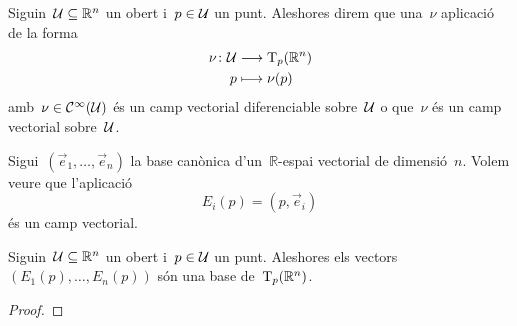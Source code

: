 \documentclass[../geometria-diferencial.tex]{subfiles}
\begin{document}
    \begin{definition}
        \label{def:camp-vectorial-diferenciable}
        Siguin~\(\mathcal{U}\subseteq\mathbb{R}^{n}\) un obert i~\(p\in\mathcal{U}\) un punt.
        Aleshores direm que una~\(\nu\) aplicació de la forma
        \begin{align*}
            \nu\colon\mathcal{U}&\longrightarrow\operatorname{T}_{p}(\mathbb{R}^{n}) \\
            p&\longmapsto\nu(p)
        \end{align*}
        amb~\(\nu\in\mathcal{C}^{\infty}(\mathcal{U})\) és un camp vectorial diferenciable sobre~\(\mathcal{U}\) o que~\(\nu\) és un camp vectorial sobre~\(\mathcal{U}\).
    \end{definition}
    \begin{example}%
        \label{ex:camp-vectorial-canonic}
        Sigui~\((\vec{e}_{1},\dots,\vec{e}_{n})\) la base canònica d'un~\(\mathbb{R}\)-espai vectorial de dimensió~\(n\).
        Volem veure que l'aplicació
        \[
            E_{i}(p)=(p,\vec{e}_{i})
        \]
        és un camp vectorial.
    \end{example}
    \begin{solution}
    \end{solution}
    \begin{proposition}
        \label{prop:els-camps-vectorials-canonics-son-una-base-de-lespai-tangent}
        Siguin~\(\mathcal{U}\subseteq\mathbb{R}^{n}\) un obert i~\(p\in\mathcal{U}\) un punt.
        Aleshores els vectors~\((E_{1}(p),\dots,E_{n}(p))\) són una base de~\(\operatorname{T}_{p}(\mathbb{R}^{n})\).
    \end{proposition}
    \begin{proof}
    \end{proof}
\end{document}
